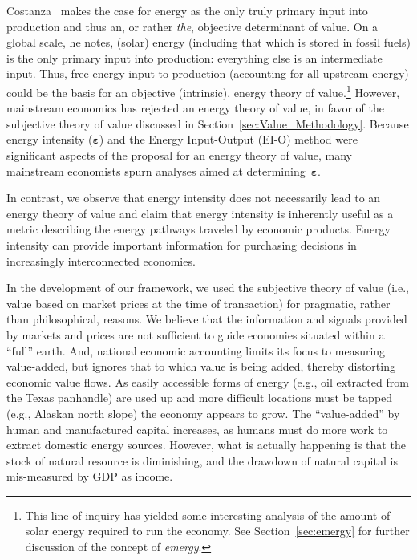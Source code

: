 Costanza~\cite{Costanza:2004we} makes the case for energy 
as the only truly primary input into production 
and thus an, or rather \emph{the}, objective determinant of value. 
On a global scale, he notes, (solar) energy 
(including that which is stored in fossil fuels) is 
the only primary input into production:
everything else is an intermediate input. 
Thus, free energy input to production (accounting for all upstream energy)
could be the basis for an objective (intrinsic), 
energy theory of value.\footnote{This line 
	of inquiry has yielded some interesting analysis of the amount 
	of solar energy required to run the economy. 
	See Section~\ref{sec:emergy} for further discussion of the concept of \emph{emergy}.}
However, mainstream economics has rejected an energy theory of value, 
in favor of the subjective theory of value discussed in Section~\ref{sec:Value_Methodology}.
Because energy intensity ($\boldsymbol{\varepsilon}$) 
and the Energy Input-Output (EI-O) method 
were significant aspects of the 
proposal for an energy theory of value, 
many mainstream economists spurn 
analyses aimed at determining~$\boldsymbol{\varepsilon}$.

In contrast, we observe that energy intensity 
does not necessarily lead to an energy theory of value
and claim that energy intensity is inherently useful
as a metric describing the energy pathways traveled by economic products.
Energy intensity can provide important information for purchasing decisions
in increasingly interconnected economies.

In the development of our framework, we used the subjective theory of value 
(i.e., value based on market prices at the time of transaction) 
for pragmatic, rather than philosophical, reasons.
We believe that the information and signals provided by markets and prices 
are not sufficient to guide economies situated within a ``full'' earth.
And, national economic accounting limits its focus to measuring value-added, 
but ignores that to which value is being added,
thereby distorting economic value flows. 
As easily accessible forms of energy (e.g.,  oil extracted from the Texas panhandle) 
are used up and more difficult locations must be tapped (e.g., Alaskan north slope) 
the economy appears to grow.
The ``value-added'' by human and manufactured capital increases, 
as humans must do more work to extract domestic energy sources. 
However, what is actually happening is that the stock 
of natural resource is diminishing, 
and the drawdown of natural capital is mis-measured by GDP as income.\cite[pp.~66~and~75]{Daly1997}

